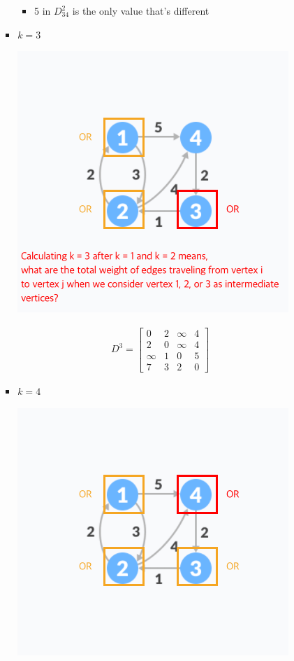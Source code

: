 \documentclass[12pt]{article}
\begin{document}
\begin{enumerate}[1.]
\begin{itemize}
\begin{itemize}
\begin{itemize}
                \begin{itemize}
                    \item 5 in $D^2_{34}$ is the only value that's different
                \end{itemize}

                \item $k = 3$

                \begin{center}
                \includegraphics[width=0.5\linewidth]{images/worksheet_4_solution_50.png}
                \end{center}

                \begin{align}
                    D^3 = \begin{bmatrix}
                        0 & 2 & \infty & 4\\
                        2 & 0 & \infty & 4\\
                        \infty & 1 & 0 & 5\\
                        7 & 3 & 2 & 0
                    \end{bmatrix}
                \end{align}

                \item $k = 4$

                \begin{center}
                \includegraphics[width=0.5\linewidth]{images/worksheet_4_solution_51.png}
                \end{center}


\end{itemize}
\end{itemize}
\end{itemize}
\end{enumerate}
\end{document}

